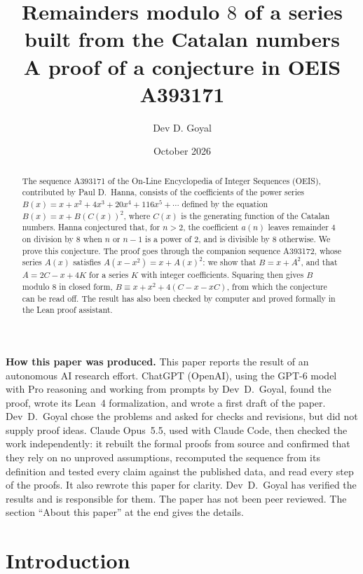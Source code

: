 \documentclass[11pt,a4paper]{article}
\title{Remainders modulo $8$ of a series built from the Catalan numbers\\[6pt]\large A proof of a conjecture in OEIS A393171}
\author{Dev D. Goyal}
\date{October 2026}
\theoremstyle{definition}
\theoremstyle{remark}
\begin{document}
\maketitle
\begin{abstract}
The sequence A393171 of the On-Line Encyclopedia of Integer Sequences (OEIS), contributed by Paul D.~Hanna, consists of
the coefficients of the power series $B(x)=x+x^2+4x^3+20x^4+116x^5+\cdots$ defined by the equation
$B(x)=x+B(C(x))^2$, where $C(x)$ is the generating function of the Catalan numbers. Hanna conjectured that, for
$n>2$, the coefficient $a(n)$ leaves remainder $4$ on division by $8$ when $n$ or $n-1$ is a power of $2$, and is
divisible by $8$ otherwise. We prove this conjecture. The proof goes through the companion sequence A393172, whose
series $A(x)$ satisfies $A(x-x^2)=x+A(x)^2$: we show that $B=x+A^2$, and that $A=2C-x+4K$ for a series $K$ with integer
coefficients. Squaring then gives $B$ modulo $8$ in closed form, $B\equiv x+x^2+4(C-x-xC)$, from which the conjecture
can be read off. The result has also been checked by computer and proved formally in the Lean proof assistant.
\end{abstract}
\begin{center}\begin{minipage}{0.88\linewidth}\small
\textbf{How this paper was produced.} This paper reports the result of an autonomous AI research effort.
ChatGPT (OpenAI), using the GPT-6 model with Pro reasoning and working from prompts by Dev~D.~Goyal, found the proof, wrote its Lean~4 formalization, and wrote a first draft of the paper.
Dev~D.~Goyal chose the problems and asked for checks and revisions, but did not supply proof ideas.
Claude Opus~5.5, used with Claude Code, then checked the work independently: it rebuilt the formal proofs from
source and confirmed that they rely on no unproved assumptions, recomputed the sequence from its definition and tested
every claim against the published data, and read every step of the proofs. It also rewrote this paper for clarity.
Dev~D.~Goyal has verified the results and is responsible for them. The paper has not been peer reviewed.
The section ``About this paper'' at the end gives the details.
\end{minipage}\end{center}

\section{Introduction}
\end{document}

